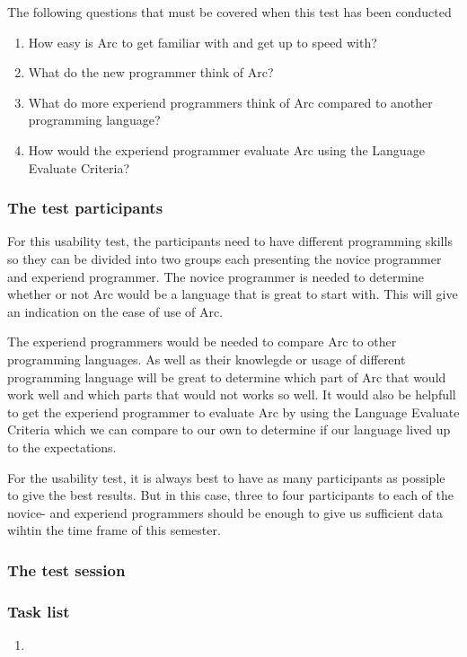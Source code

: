 The following questions that must be covered when this test has been conducted
\begin{enumerate}
    \item How easy is Arc to get familiar with and get up to speed with?
    \item What do the new programmer think of Arc?
    \item What do more experiend programmers think of Arc compared to another programming language?
    \item How would the experiend programmer evaluate Arc using the Language Evaluate Criteria?
\end{enumerate}

\subsubsection{The test participants}\label{subsubsec:theTestParticipants}
For this usability test, the participants need to have different programming skills so they can be divided into two groups each presenting the novice programmer and experiend programmer. The novice programmer is needed to determine whether or not Arc would be a language that is great to start with. This will give an indication on the ease of use of Arc.

The experiend programmers would be needed to compare Arc to other programming languages. As well as their knowlegde or usage of different programming language will be great to determine which part of Arc that would work well and which parts that would not works so well. It would also be helpfull to get the experiend programmer to evaluate Arc by using the Language Evaluate Criteria which we can compare to our own to determine if our language lived up to the expectations.

For the usability test, it is always best to have as many participants as possiple to give the best results. But in this case, three to four participants to each of the novice- and experiend programmers should be enough to give us sufficient data wihtin the time frame of this semester.

\subsubsection{The test session}\label{subsubsec:theTestSession}


\subsubsection{Task list}\label{subsubsec:taskList}
\begin{enumerate}
    \item
\end{enumerate}

